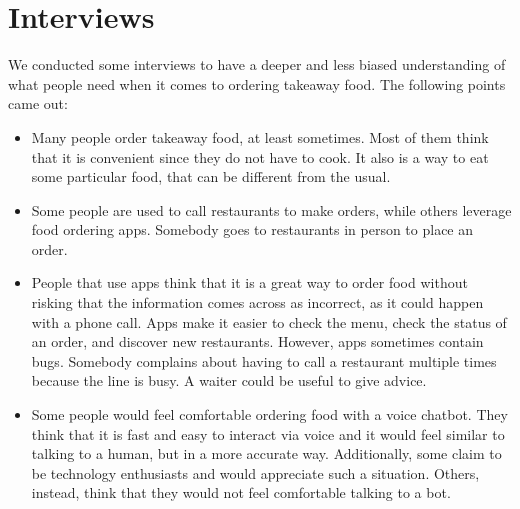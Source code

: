 \section{Interviews}

We conducted some interviews to have a deeper and less biased understanding of
what people need when it comes to ordering takeaway food. The following
points came out:

\begin{itemize}
    \item Many people order takeaway food, at least sometimes. Most of them think
    that it is convenient since they do not have to cook. It also is a way to
    eat some particular food, that can be different from the usual.
    \item Some people are used to call restaurants to make orders, while others
    leverage food ordering apps. Somebody goes to restaurants in person to place
    an order.
    \item People that use apps think that it is a great way to order food without
    risking that the information comes across as incorrect, as it could happen
    with a phone call. Apps make it easier to check the menu, check the status
    of an order, and discover new restaurants. However, apps sometimes contain
    bugs. Somebody complains about having to call a restaurant multiple
    times because the line is busy. A waiter could be useful to give advice.
    \item Some people would feel comfortable ordering food with a voice chatbot.
    They think that it is fast and easy to interact via voice and it would feel
    similar to talking to a human, but in a more accurate way. Additionally, some
    claim to be technology enthusiasts and would appreciate such a situation.
    Others, instead,
    think that they would not feel comfortable talking to a bot.

\end{itemize}